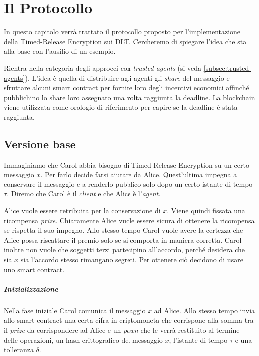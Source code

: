 \chapter{Il Protocollo}
\label{chap:protocollo}

In questo capitolo verrà trattato il protocollo proposto per l'implementazione
della Timed-Release Encryption sui DLT.
Cercheremo di spiegare
l'idea che sta alla base con l'ausilio di un esempio.

Rientra nella categoria degli approcci
con \textit{trusted agents} (si veda \ref{subsec:trusted-agents}).
L'idea è quella di distribuire agli agenti gli \textit{share} del messaggio
e sfruttare alcuni smart contract per
fornire loro degli incentivi economici affinché pubblichino lo share
loro assegnato una volta raggiunta la deadline.
La blockchain viene utilizzata come orologio di riferimento
per capire se la deadline è stata raggiunta.

\section{Versione base}
\label{sec:versione-base}
Immaginiamo che Carol abbia bisogno di Timed-Release Encryption su un certo messaggio $ x $.
Per farlo decide farsi aiutare da Alice. Quest'ultima
impegna a conservare il messaggio e a renderlo pubblico solo dopo un
certo istante di tempo $ \tau $.
Diremo che Carol è il \textit{client} e che Alice è l'\textit{agent}.

Alice vuole essere retribuita per la conservazione di $ x $. Viene quindi fissata
una ricompensa \textit{prize}. Chiaramente Alice vuole essere sicura di
ottenere la ricompensa se rispetta il suo impegno. Allo stesso tempo Carol
vuole avere la certezza che Alice possa riscattare il premio solo se si comporta
in maniera corretta.
Carol inoltre non vuole che soggetti terzi partecipino all'accordo, perché desidera
che sia $ x $ sia l'accordo stesso rimangano segreti.
Per ottenere ciò decidono di usare uno smart contract.

\paragraph{Inizializzazione}
Nella fase iniziale Carol comunica il messaggio $ x $ ad Alice. Allo stesso tempo invia
allo smart contract una certa cifra in criptomoneta
che corrispone alla somma tra il \textit{prize} da corrispondere ad Alice e un
\textit{pawn} che le verrà restituito al termine delle operazioni, un hash
crittografico del messaggio $ x $, l'istante di tempo $ \tau $ e una tolleranza $ \delta $.

